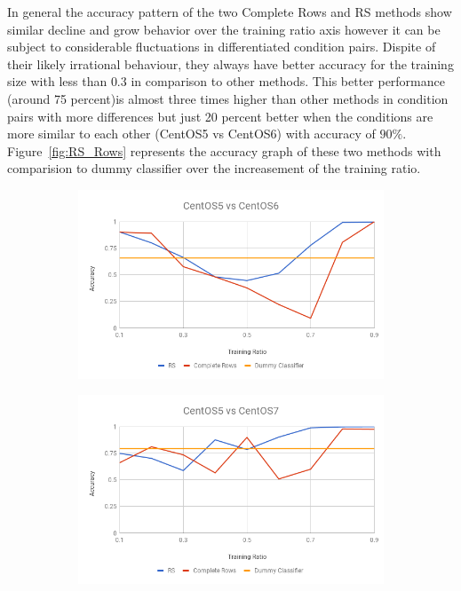 \documentclass[10pt, conference, compsocconf]{IEEEtran}
\begin{document}
In general the accuracy pattern of the two Complete Rows and 
RS methods show similar decline and grow behavior over the 
training ratio axis however it can be subject to considerable 
fluctuations in differentiated condition pairs. Dispite of their 
likely irrational behaviour, they always have better accuracy 
for the training size with less than $0.3$ in comparison to other 
methods. This better performance (around 75 percent)is almost three 
times higher than other methods in condition pairs with more 
differences but just 20 percent better when the conditions are more 
similar to each other (CentOS5 vs CentOS6) with accuracy of $90\%$.
Figure~\ref{fig:RS_Rows} represents
the accuracy graph of these two methods with comparision to dummy
classifier over the increasement of the training ratio.
\begin{figure}[h!]
        \centering
        \begin{subfigure}[b]{0.4\linewidth}
                \includegraphics[width=\columnwidth]{figures/RS_Rows_5vs6}
        \end{subfigure}
        \begin{subfigure}[b]{0.4\linewidth}
                \includegraphics[width=\columnwidth]{figures/RS_Rows_5vs7}

\end{subfigure}
\end{figure}
\end{document}
